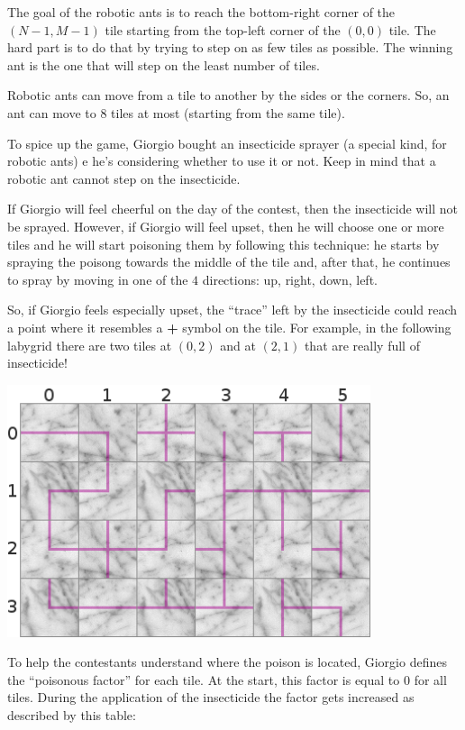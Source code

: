 The goal of the robotic ants is to reach the bottom-right corner of the $(N-1, M-1)$ tile starting from the top-left corner of the $(0, 0)$ tile. The hard part is to do that by trying to step on as few tiles as possible. The winning ant is the one that will step on the least number of tiles.

\begin{warning}
  Robotic ants can move from a tile to another by the sides or the corners. So, an ant can move to $8$ tiles at most (starting from the same tile).
\end{warning}

To spice up the game, Giorgio bought an insecticide sprayer (a special kind, for robotic ants) e he's considering whether to use it or not. Keep in mind that a robotic ant cannot step on the insecticide.

If Giorgio will feel cheerful on the day of the contest, then the insecticide will not be sprayed. However, if Giorgio will feel upset, then he will choose one or more tiles and he will start poisoning them by following this technique: he starts by spraying the poisong towards the middle of the tile and, after that, he continues to spray by moving in one of the $4$ directions: up, right, down, left.

So, if Giorgio feels especially upset, the ``trace'' left by the insecticide could reach a point where it resembles a { \Large \color{magenta} \textbf{+} } symbol on the tile. For example, in the following labygrid there are two tiles at $(0, 2)$ and at $(2, 1)$ that are really full of insecticide!

\begin{center}
  \includegraphics[width=0.8\textwidth]{floor-poison.png}
\end{center}

To help the contestants understand where the poison is located, Giorgio defines the ``poisonous factor'' for each tile. At the start, this factor is equal to $0$ for all tiles. During the application of the insecticide the factor gets increased as described by this table:

